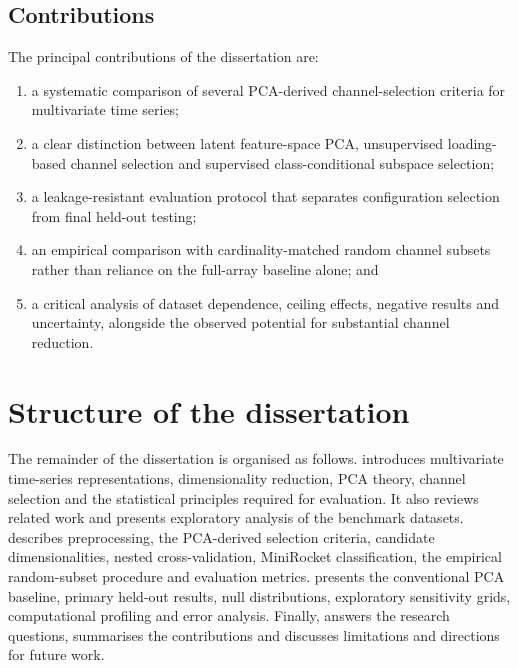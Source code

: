 \subsection{Contributions}

The principal contributions of the dissertation are:

\begin{enumerate}[leftmargin=*]
    \item a systematic comparison of several PCA-derived channel-selection criteria for multivariate time series;
    \item a clear distinction between latent feature-space PCA, unsupervised loading-based channel selection and supervised class-conditional subspace selection;
    \item a leakage-resistant evaluation protocol that separates configuration selection from final held-out testing;
    \item an empirical comparison with cardinality-matched random channel subsets rather than reliance on the full-array baseline alone; and
    \item a critical analysis of dataset dependence, ceiling effects, negative results and uncertainty, alongside the observed potential for substantial channel reduction.
\end{enumerate}

\section{Structure of the dissertation}

The remainder of the dissertation is organised as follows.  introduces multivariate time-series representations, dimensionality reduction, PCA theory, channel selection and the statistical principles required for evaluation. It also reviews related work and presents exploratory analysis of the benchmark datasets.  describes preprocessing, the PCA-derived selection criteria, candidate dimensionalities, nested cross-validation, MiniRocket classification, the empirical random-subset procedure and evaluation metrics.  presents the conventional PCA baseline, primary held-out results, null distributions, exploratory sensitivity grids, computational profiling and error analysis. Finally,  answers the research questions, summarises the contributions and discusses limitations and directions for future work.
